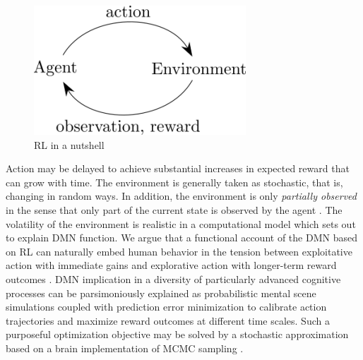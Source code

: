\documentclass[10pt,letterpaper]{article}
\begin{document}
\begin{figure}
  \centering
  \includegraphics{aeloop-300x183.png}
  \caption{RL in a nutshell}
  \label{fig:rl}
\end{figure}

Action may be delayed to achieve substantial increases in expected reward
that can grow with time.
The environment is generally taken as stochastic,
that is, changing in random ways. In addition,
the environment is only \textit{partially observed}
in the sense that only part of the current state is observed by
the agent \citep{starkweather2017dopamine}.
The volatility of the environment
is realistic in a computational model which sets out
to explain DMN function.
We argue that a functional account of the DMN based on RL
can naturally embed human behavior
in the tension between exploitative action with immediate gains and
explorative action with longer-term reward outcomes
\citep{dayan2008decision}.
DMN implication in a diversity of
particularly advanced cognitive processes
can be parsimoniously explained as probabilistic mental
scene simulations coupled with prediction error minimization
to calibrate action trajectories and
maximize reward outcomes at different time scales.
Such a purposeful optimization objective
may be solved by a stochastic approximation
based on a brain implementation of MCMC sampling
\citep{tenenbaum2011grow}.
\end{document}
